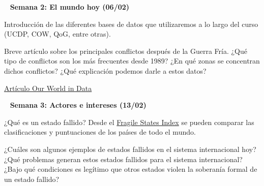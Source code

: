 \documentclass[11pt, a4paper]{article}
\begin{document}
\begin{center} 
\begin{minipage}{6in}
{\color{darkgreen}{\Rectangle}} ~ \textbf{{\large{Semana 2: El mundo hoy (06/02)}}}\vspace{0,5em}

Introducción de las diferentes bases de datos que utilizaremos a lo largo del curso (UCDP, COW, QoG, entre otras).\vspace{0,5em}

Breve artículo sobre los principales conflictos después de la Guerra Fría. ¿Qué tipo de conflictos son los más frecuentes desde 1989? ¿En qué zonas se concentran dichos conflictos? ¿Qué explicación podemos darle a estos datos?\vspace{0,5em}

\href{https://ourworldindata.org/conflict-deaths-breakdown}{Artículo Our World in Data}
\end{minipage}
\end{center}

\begin{center} 
\begin{minipage}{6in}
\begin{flushleft}
{\color{darkgreen}{\Rectangle}} ~ \textbf{{\large{Semana 3: Actores e intereses (13/02)}}}
\end{flushleft}
¿Qué es un estado fallido? Desde el \href{https://fragilestatesindex.org/analytics/fsi-heat-map/}{Fragile States Index} se pueden comparar las clasificaciones y puntuaciones de los países de todo el mundo. \vspace{0,5em}

¿Cuáles son algunos ejemplos de estados fallidos en el sistema internacional hoy? ¿Qué problemas generan estos estados fallidos para el sistema internacional? ¿Bajo qué condiciones es legítimo que otros estados violen la soberanía formal de un estado fallido?
\end{minipage}
\end{center}
\end{document}
